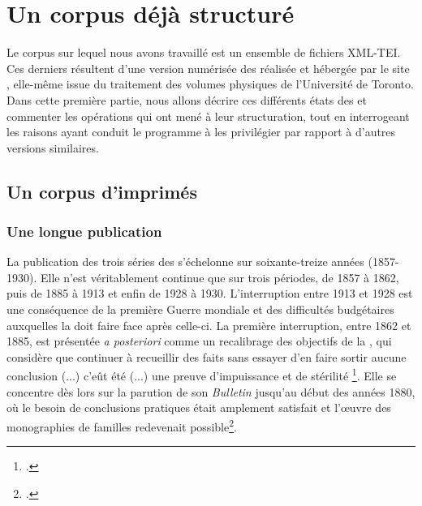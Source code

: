 \part{Un corpus déjà structuré}

\clearpage
\thispagestyle{empty}
\cleardoublepage
{}
Le corpus sur lequel nous avons travaillé est un ensemble de fichiers XML-TEI. Ces derniers résultent d'une version numérisée des \odm{} réalisée et hébergée par le site \ia, elle-même issue du traitement des volumes physiques de l'Université de Toronto. Dans cette première partie, nous allons décrire ces différents états des \odm{} et commenter les opérations qui ont mené à leur structuration, tout en interrogeant les raisons ayant conduit le programme \timeus{} à les privilégier par rapport à d'autres versions similaires.

\chapter{Un corpus d'imprimés}

\section{Une longue publication}
\label{part:I1_longue_pub}

La publication des trois séries des \odm{} s'échelonne sur soixante-treize années (1857-1930). Elle n'est véritablement continue que sur trois périodes, de 1857 à 1862, puis de 1885 à 1913 et enfin de 1928 à 1930. L'interruption entre 1913 et 1928 est une conséquence de la première Guerre mondiale et des difficultés budgétaires auxquelles la \sess{} doit faire face après celle-ci. La première interruption, entre 1862 et 1885, est présentée \textit{a posteriori} comme un recalibrage des objectifs de la \sess, qui considère que \og continuer à recueillir des faits sans essayer d'en faire sortir aucune conclusion (...) c'eût été (...) une preuve d'impuissance et de stérilité \fg{}\footcite[p. I]{averts1t5}. Elle se concentre dès lors sur la parution de son \textit{Bulletin} jusqu'au début des années 1880, où \og le besoin de conclusions pratiques était amplement satisfait \fg{} et \og  l'œuvre des monographies de familles \fg{} redevenait possible\footcite[p. II]{averts1t5}.

